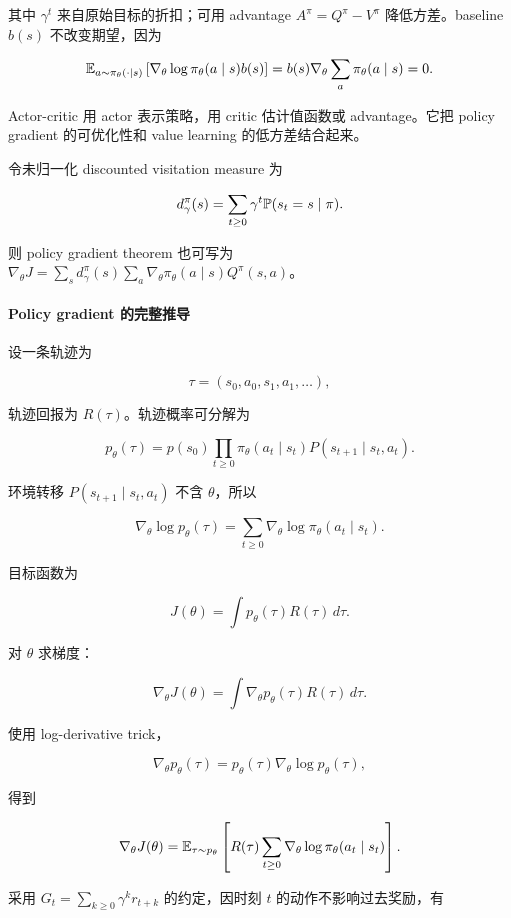 \documentclass[11pt]{ctexart}
\begin{document}
其中 \(\gamma^t\) 来自原始目标的折扣；可用 advantage \(A^\pi=Q^\pi-V^\pi\) 降低方差。baseline \(b(s)\) 不改变期望，因为

\[
  \mathbb{E}_{a\sim\pi_\theta(\cdot\mid s)}
  \left[
    \nabla_\theta\log\pi_\theta(a\mid s)b(s)
  \right]
  =
  b(s)\nabla_\theta\sum_a\pi_\theta(a\mid s)
  =
  0.
\]

Actor-critic 用 actor 表示策略，用 critic 估计值函数或 advantage。它把 policy gradient 的可优化性和 value learning 的低方差结合起来。

令未归一化 discounted visitation measure 为

\[
  d^\pi_\gamma(s)=\sum_{t\ge0}\gamma^t\mathbb{P}(s_t=s\mid\pi).
\]

则 policy gradient theorem 也可写为 \(\nabla_\theta J=\sum_s d^\pi_\gamma(s)\sum_a\nabla_\theta\pi_\theta(a\mid s)Q^\pi(s,a)\)。

\paragraph{Policy gradient 的完整推导}

设一条轨迹为

\[
  \tau=(s_0,a_0,s_1,a_1,\ldots),
\]

轨迹回报为 \(R(\tau)\)。轨迹概率可分解为

\[
  p_\theta(\tau)
  =
  p(s_0)
  \prod_{t\ge0}
  \pi_\theta(a_t\mid s_t)
  P(s_{t+1}\mid s_t,a_t).
\]

环境转移 \(P(s_{t+1}\mid s_t,a_t)\) 不含 \(\theta\)，所以

\[
  \nabla_\theta\log p_\theta(\tau)
  =
  \sum_{t\ge0}
  \nabla_\theta\log\pi_\theta(a_t\mid s_t).
\]

目标函数为

\[
  J(\theta)
  =
  \int p_\theta(\tau)R(\tau)\,d\tau.
\]

对 \(\theta\) 求梯度：

\[
  \nabla_\theta J(\theta)
  =
  \int
  \nabla_\theta p_\theta(\tau)R(\tau)\,d\tau.
\]

使用 log-derivative trick，

\[
  \nabla_\theta p_\theta(\tau)
  =
  p_\theta(\tau)\nabla_\theta\log p_\theta(\tau),
\]

得到

\[
  \nabla_\theta J(\theta)
  =
  \mathbb{E}_{\tau\sim p_\theta}
  \left[
    R(\tau)
    \sum_{t\ge0}
    \nabla_\theta\log\pi_\theta(a_t\mid s_t)
  \right].
\]

采用 \(G_t=\sum_{k\ge0}\gamma^k r_{t+k}\) 的约定，因时刻 \(t\) 的动作不影响过去奖励，有
\end{document}
